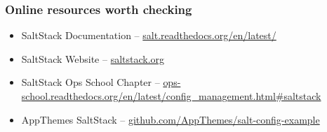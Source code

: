 \documentclass[compress]{beamer}
\begin{document}
\begin{frame}
\frametitle{Online resources worth checking}

\begin{itemize}
  \item SaltStack Documentation -- \href{http://salt.readthedocs.org/en/latest/}{salt.readthedocs.org/en/latest/}
  \item SaltStack Website -- \href{http://saltstack.com/about.html}{saltstack.org}
  \item SaltStack Ops School Chapter -- \href{http://ops-school.readthedocs.org/en/latest/config\_management.html\#saltstack}{ops-school.readthedocs.org/en/latest/config\_management.html\#saltstack}
  \item AppThemes SaltStack -- \href{https://github.com/AppThemes/salt-config-example}{github.com/AppThemes/salt-config-example}
\end{itemize}

\end{frame}
\end{document}
